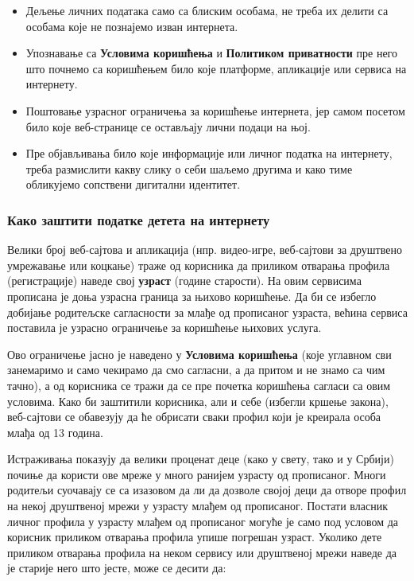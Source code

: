 \documentclass[a4paper]{article}
\begin{document}
\begin{itemize}
	
\item     Дељење личних података само са блиским особама, не треба их делити са особама које не познајемо изван интернета.

\item     Упознавање са \textbf{Условима коришћења}\cite{EULA} и \textbf{Политиком приватности}\cite{PP} пре него што почнемо са коришћењем било које платформе, апликације или сервиса на интернету.
    
\item    Поштовање узрасног ограничења за коришћење интернета, јер самом посетом било које веб-странице се остављају лични подаци на њој.
    
\item      Пре објављивања било које информације или личног податка на интернету, треба размислити какву слику о себи шаљемо другима и како тиме обликујемо сопствени дигитални идентитет.
\end{itemize}  

\subsubsection{Како заштити податке детета на интернету}

Велики број веб-сајтова и апликација (нпр. видео-игре, веб-сајтови за друштвено умрежавање или коцкање) траже од корисника да приликом отварања профила (регистрације) наведе свој \textbf{узраст} (године старости). На овим сервисима прописана је доња узрасна граница за њихово коришћење.
Да би се избегло добијање родитељске сагласности за млађе од прописаног узраста, већина сервиса поставила је узрасно ограничење за коришћење њихових услуга.

Ово ограничење јасно је наведено у \textbf{Условима коришћења} \cite{TOS}(које углавном сви занемаримо и само чекирамо да смо сагласни, а да притом и не знамо са чим тачно), а од корисника се тражи да се пре почетка коришћења сагласи са овим условима. Како би заштитили корисника, али и себе (избегли кршење закона), веб-сајтови се обавезују да ће обрисати сваки профил који је креирала особа млађа од 13 година. 

Истраживања показују да велики проценат деце (како у свету, тако и у Србији) почиње да користи ове мреже у много ранијем узрасту од прописаног.
Многи родитељи суочавају се са изазовом да ли да дозволе својој деци да отворе профил на некој друштвеној мрежи у узрасту млађем од прописаног. Постати власник личног профила у узрасту млађем од прописаног могуће је само под условом да корисник приликом отварања профила упише погрешан узраст.
Уколико дете приликом отварања профила на неком сервису или друштвеној мрежи наведе да је старије него што јесте, може се десити да:
\end{document}
